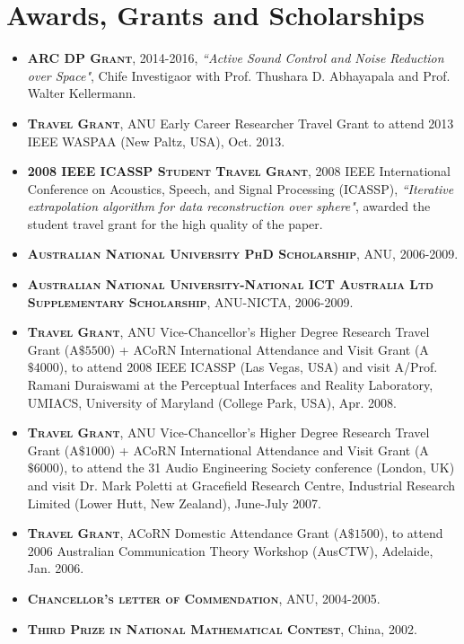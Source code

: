 \documentclass[11pt]{article}
\begin{document}
\section*{Awards, Grants and Scholarships}
%
\begin{itemize}
%

\item \textsc{\textbf{ARC DP Grant}}, 2014-2016, \emph{``Active Sound Control and Noise Reduction over Space"}, Chife Investigaor with Prof. Thushara D. Abhayapala and Prof. Walter Kellermann.

\item \textsc{\textbf{Travel Grant}}, ANU Early Career Researcher Travel Grant to attend 2013 IEEE WASPAA (New Paltz, USA), Oct. 2013.

\item \textsc{\textbf{2008 IEEE ICASSP Student Travel Grant}}, 2008 IEEE International Conference on Acoustics,
Speech, and Signal Processing (ICASSP), \emph{``Iterative extrapolation algorithm for data reconstruction over sphere"}, awarded the student
travel grant for the high quality of the paper.

\item \textsc{\textbf{Australian National University PhD Scholarship}}, ANU, 2006-2009.

\item \textsc{\textbf{Australian National University-National ICT Australia Ltd Supplementary Scholarship}},
ANU-NICTA, 2006-2009.

\item \textsc{\textbf{Travel Grant}}, ANU Vice-Chancellor's Higher Degree Research Travel Grant (A$\$5500$)
+ ACoRN International Attendance and Visit Grant (A$\$4000$), to attend 2008 IEEE ICASSP (Las Vegas, USA) and visit A/Prof. Ramani Duraiswami at
the Perceptual Interfaces and Reality Laboratory, UMIACS, University of Maryland (College Park, USA), Apr. 2008.

\item \textsc{\textbf{Travel Grant}}, ANU Vice-Chancellor's Higher Degree Research Travel Grant (A$\$1000$)
+ ACoRN International Attendance and Visit Grant (A$\$6000$), to attend the 31 Audio Engineering Society conference (London, UK) and visit Dr.
Mark Poletti at Gracefield Research Centre, Industrial Research Limited (Lower Hutt, New Zealand), June-July 2007.

\item \textsc{\textbf{Travel Grant}}, ACoRN Domestic Attendance Grant (A$\$1500$), to attend 2006 Australian Communication Theory Workshop
(AusCTW), Adelaide, Jan. 2006.

\item \textsc{\textbf{Chancellor's letter of Commendation}}, ANU, 2004-2005.

\item \textsc{\textbf{Third Prize in National Mathematical Contest}}, China, 2002.

\end{itemize}
\end{document}
